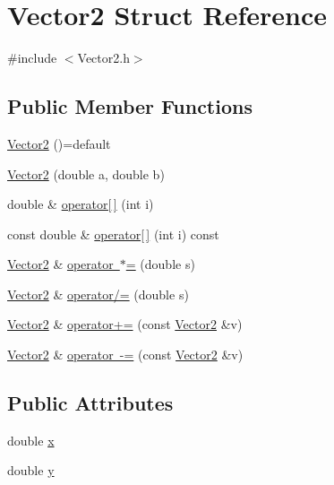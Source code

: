 \hypertarget{struct_vector2}{}\section{Vector2 Struct Reference}
\label{struct_vector2}


{\ttfamily \#include $<$Vector2.\+h$>$}

\subsection*{Public Member Functions}
\begin{DoxyCompactItemize}
\item 
\mbox{\hyperlink{struct_vector2_af1de25cf0004820d5e6db855c91bc4ad}{Vector2}} ()=default
\item 
\mbox{\hyperlink{struct_vector2_a3df68e1e1f4e6415c8d0839ed12e7d00}{Vector2}} (double a, double b)
\item 
double \& \mbox{\hyperlink{struct_vector2_a6c9c69723e9775ef86bb42dc8396c22e}{operator\mbox{[}$\,$\mbox{]}}} (int i)
\item 
const double \& \mbox{\hyperlink{struct_vector2_aae8e74dc12a621b7c3a7c1491a02223b}{operator\mbox{[}$\,$\mbox{]}}} (int i) const
\item 
\mbox{\hyperlink{struct_vector2}{Vector2}} \& \mbox{\hyperlink{struct_vector2_a2686aed24066cab2940438ca54032acf}{operator $\ast$=}} (double s)
\item 
\mbox{\hyperlink{struct_vector2}{Vector2}} \& \mbox{\hyperlink{struct_vector2_a043e5e4bd08aa631d23ca89760d43939}{operator/=}} (double s)
\item 
\mbox{\hyperlink{struct_vector2}{Vector2}} \& \mbox{\hyperlink{struct_vector2_a4aa43747680ca286b4e274c8d85478d5}{operator+=}} (const \mbox{\hyperlink{struct_vector2}{Vector2}} \&v)
\item 
\mbox{\hyperlink{struct_vector2}{Vector2}} \& \mbox{\hyperlink{struct_vector2_ac5bf883e874f5c961476ac2592c18cd7}{operator -\/=}} (const \mbox{\hyperlink{struct_vector2}{Vector2}} \&v)
\end{DoxyCompactItemize}
\subsection*{Public Attributes}
\begin{DoxyCompactItemize}
\item 
double \mbox{\hyperlink{struct_vector2_a61d73d9036ccbb3257fbe595c014a1d0}{x}}
\item 
double \mbox{\hyperlink{struct_vector2_a4df9b2a8e79e6e30a7a3b34722d8b8b8}{y}}
\end{DoxyCompactItemize}


